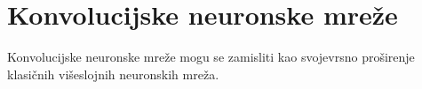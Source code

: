 \section{Konvolucijske neuronske mreže}

Konvolucijske neuronske mreže mogu se zamisliti kao svojevrsno proširenje klasičnih višeslojnih neuronskih mreža. 